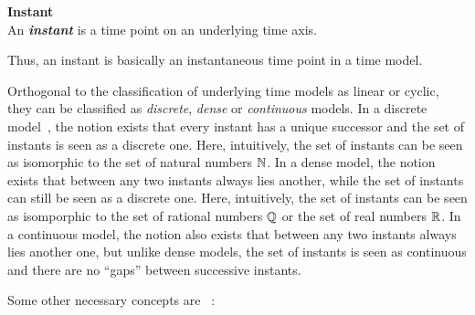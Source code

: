 \begin{svgraybox}
\vspace{-10pt}
\begin{definition}\textbf{Instant}~\cite{Dyreson1994}\\
An \emph{\textbf{instant}} is a time point on an underlying time axis.
\end{definition}
\vspace{-10pt}
\end{svgraybox}

Thus, an instant is basically an instantaneous time point in a time model.

Orthogonal to the classification of underlying time models as linear or cyclic, they can be classified as \emph{discrete}, \emph{dense} or \emph{continuous} models. In a discrete model~\cite{Clifford:1985:AHR:971699.318922}, the notion exists that every instant has a unique successor and the set of instants is seen as a discrete one. Here, intuitively, the set of instants can be seen as isomorphic to the set of natural numbers $\mathbb{N}$. In a dense model, the notion exists that between any two instants always lies another, while the set of instants can still be seen as a discrete one. Here, intuitively, the set of instants can be seen as isomporphic to the set of rational numbers $\mathbb{Q}$ or the set of real numbers $\mathbb{R}$. In a continuous model, the notion also exists that between any two instants always lies another one, but unlike dense models, the set of instants is seen as continuous and there are no ``gaps'' between successive instants.

Some other necessary concepts are ~\cite{Dyreson1994}:

